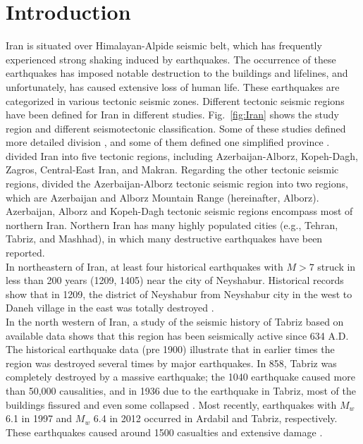\section{Introduction}
Iran is situated over Himalayan-Alpide seismic belt, which has frequently experienced strong shaking induced by earthquakes. The occurrence of these earthquakes has imposed notable destruction to the buildings and lifelines, and unfortunately, has caused extensive loss of human life. These earthquakes are categorized in various tectonic seismic zones. Different tectonic seismic regions have been defined for Iran in different studies.  Fig.~\ref{fig:Iran} shows the study region and different seismotectonic classification. Some of these studies defined more detailed division \citep{Nowroozi1976, Tavakoli1999}, and some of them defined one simplified province \citep{Stocklin1968, Takin1972, Berberian1976}. \citet{Mirzaei1998} divided Iran into five tectonic regions, including Azerbaijan-Alborz, Kopeh-Dagh, Zagros, Central-East Iran, and Makran. Regarding the other tectonic seismic regions, \citet{Karimiparidari2013} divided the Azerbaijan-Alborz tectonic seismic region into two regions, which are Azerbaijan and Alborz Mountain Range (hereinafter, Alborz). Azerbaijan, Alborz and Kopeh-Dagh tectonic seismic regions encompass most of northern Iran. Northern Iran has many highly populated cities (e.g., Tehran, Tabriz, and Mashhad), in which many destructive earthquakes have been reported.\\
\noindent
In northeastern of Iran, at least four historical earthquakes with $M>7$ struck in less than 200 years (1209, 1405) near the city of Neyshabur. Historical records show that in 1209, the district of Neyshabur from Neyshabur city in the west to Daneh village in the east was totally destroyed \citep{Berberian1999}.\\
\noindent
In the north western of Iran, a study of the seismic history of Tabriz based on available data shows that this region has been seismically active since 634 A.D. The historical earthquake data (pre 1900) illustrate that in earlier times the region was destroyed several times by major earthquakes. In 858, Tabriz was completely destroyed by a massive earthquake; the 1040 earthquake caused more than 50,000 causalities, and in 1936 due to the earthquake in Tabriz, most of the buildings fissured and even some collapsed \citep{Berberian1999}. Most recently, earthquakes with $M_w$ 6.1 in 1997 and $M_w$ 6.4 in 2012 occurred in Ardabil and Tabriz, respectively. These earthquakes caused around 1500 casualties and extensive damage \citep{USGS_ardabil,USGS_tabriz}.\\
